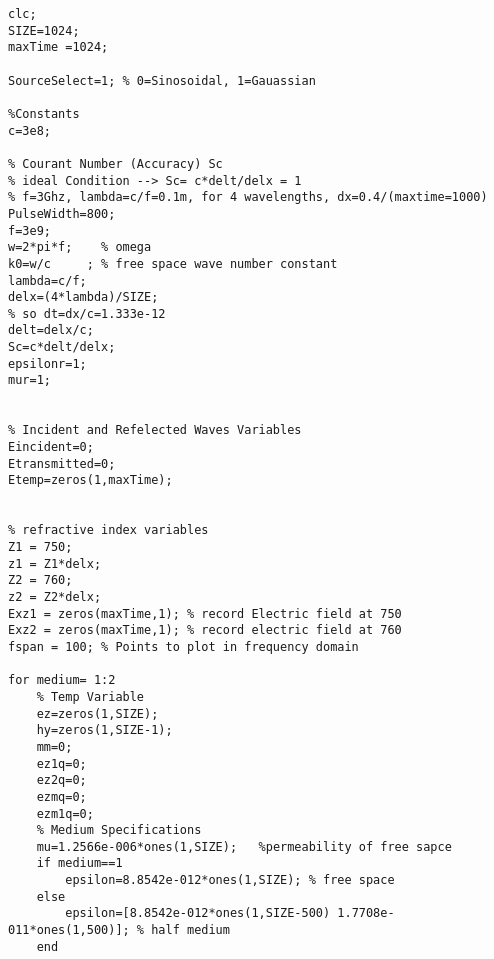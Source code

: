 \begin{lstlisting}
clc;
SIZE=1024;   
maxTime =1024;

SourceSelect=1; % 0=Sinosoidal, 1=Gauassian

%Constants
c=3e8;

% Courant Number (Accuracy) Sc
% ideal Condition --> Sc= c*delt/delx = 1
% f=3Ghz, lambda=c/f=0.1m, for 4 wavelengths, dx=0.4/(maxtime=1000)
PulseWidth=800;
f=3e9;
w=2*pi*f;    % omega
k0=w/c     ; % free space wave number constant
lambda=c/f;
delx=(4*lambda)/SIZE;
% so dt=dx/c=1.333e-12
delt=delx/c;
Sc=c*delt/delx;
epsilonr=1;
mur=1;


% Incident and Refelected Waves Variables
Eincident=0;
Etransmitted=0;
Etemp=zeros(1,maxTime);


% refractive index variables
Z1 = 750;
z1 = Z1*delx;
Z2 = 760;
z2 = Z2*delx;
Exz1 = zeros(maxTime,1); % record Electric field at 750
Exz2 = zeros(maxTime,1); % record electric field at 760
fspan = 100; % Points to plot in frequency domain

for medium= 1:2
    % Temp Variable
    ez=zeros(1,SIZE);
    hy=zeros(1,SIZE-1);
    mm=0;
    ez1q=0;
    ez2q=0;
    ezmq=0;
    ezm1q=0;
    % Medium Specifications
    mu=1.2566e-006*ones(1,SIZE);   %permeability of free sapce
    if medium==1
        epsilon=8.8542e-012*ones(1,SIZE); % free space
    else
        epsilon=[8.8542e-012*ones(1,SIZE-500) 1.7708e-011*ones(1,500)]; % half medium
    end



\end{lstlisting}
